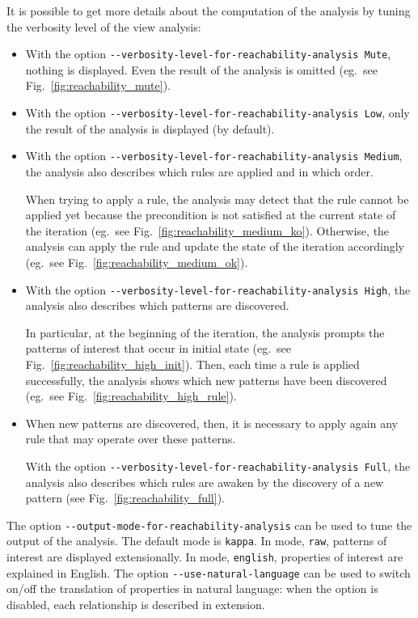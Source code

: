 \documentclass[11pt]{book}
\begin{document}
It is possible to get more details about the computation of the analysis by tuning the verbosity level of the view analysis:
\begin{itemize}
\item With the option \verb?--verbosity-level-for-reachability-analysis Mute?, nothing is displayed. Even the result of the analysis is omitted (eg.~see Fig.~\ref{fig:reachability_mute}).

\item With the option \verb?--verbosity-level-for-reachability-analysis Low?, only the result of the analysis is displayed (by default).

\item With the option \verb?--verbosity-level-for-reachability-analysis Medium?, the analysis also describes which rules are applied and in which order.

When trying to apply a rule, the analysis may detect that the rule cannot be applied yet because the precondition is not satisfied at the current state of the iteration (eg.~see Fig.~\ref{fig:reachability_medium_ko}). Otherwise, the analysis can apply the rule and update the state of the iteration accordingly (eg.~see Fig.~\ref{fig:reachability_medium_ok}).



\item With the option \verb?--verbosity-level-for-reachability-analysis High?, the analysis also describes which patterns are discovered.

In particular, at the beginning of the iteration, the analysis prompts the patterns of interest that occur in initial state (eg.~see Fig.~\ref{fig:reachability_high_init}). Then, each time a rule is applied successfully, the analysis shows which new patterns have been discovered (eg.~see Fig.~\ref{fig:reachability_high_rule}).


\item When new patterns are discovered, then, it is necessary to apply again any rule that may operate over these patterns.

With the option \verb?--verbosity-level-for-reachability-analysis Full?, the analysis also describes which rules are awaken by the discovery of a new pattern (see Fig.~\ref{fig:reachability_full}).

\end{itemize}

The option \verb?--output-mode-for-reachability-analysis? can be used to tune the output of the analysis. The default mode is \verb?kappa?.
In mode, \verb?raw?, patterns of interest are displayed extensionally.
In mode, \verb?english?, properties of interest are explained in English.
The option \verb?--use-natural-language? can be used to switch on/off the translation of properties in natural language: when the option is disabled, each relationship is described in extension.
\end{document}
